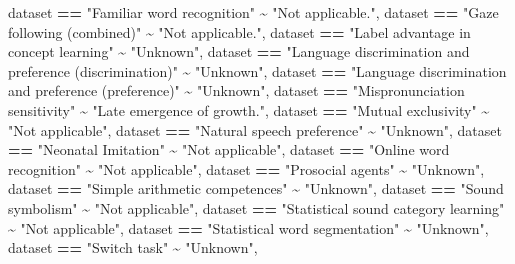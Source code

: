\documentclass[
]{article}
\newenvironment{Shaded}{\begin{snugshade}}{\end{snugshade}}
\newcommand{\NormalTok}[1]{#1}
\newcommand{\SpecialCharTok}[1]{\textcolor[rgb]{0.81,0.36,0.00}{\textbf{#1}}}
\newcommand{\StringTok}[1]{\textcolor[rgb]{0.31,0.60,0.02}{#1}}
\begin{document}
\begin{Shaded}
\begin{Highlighting}[]
\NormalTok{      dataset }\SpecialCharTok{==} \StringTok{"Familiar word recognition"} \SpecialCharTok{\textasciitilde{}} \StringTok{"Not applicable."}\NormalTok{, }
\NormalTok{      dataset }\SpecialCharTok{==} \StringTok{"Gaze following (combined)"} \SpecialCharTok{\textasciitilde{}} \StringTok{"Not applicable."}\NormalTok{, }
\NormalTok{      dataset }\SpecialCharTok{==} \StringTok{"Label advantage in concept learning"} \SpecialCharTok{\textasciitilde{}} \StringTok{"Unknown"}\NormalTok{, }
\NormalTok{      dataset }\SpecialCharTok{==} \StringTok{"Language discrimination and preference (discrimination)"} \SpecialCharTok{\textasciitilde{}} \StringTok{"Unknown"}\NormalTok{, }
\NormalTok{      dataset }\SpecialCharTok{==} \StringTok{"Language discrimination and preference (preference)"} \SpecialCharTok{\textasciitilde{}} \StringTok{"Unknown"}\NormalTok{, }
\NormalTok{      dataset }\SpecialCharTok{==} \StringTok{"Mispronunciation sensitivity"} \SpecialCharTok{\textasciitilde{}} \StringTok{"Late emergence of growth."}\NormalTok{, }
\NormalTok{      dataset }\SpecialCharTok{==} \StringTok{"Mutual exclusivity"} \SpecialCharTok{\textasciitilde{}} \StringTok{"Not applicable"}\NormalTok{,}
\NormalTok{      dataset }\SpecialCharTok{==} \StringTok{"Natural speech preference"} \SpecialCharTok{\textasciitilde{}} \StringTok{"Unknown"}\NormalTok{,}
\NormalTok{      dataset }\SpecialCharTok{==} \StringTok{"Neonatal Imitation"} \SpecialCharTok{\textasciitilde{}} \StringTok{"Not applicable"}\NormalTok{, }
\NormalTok{      dataset }\SpecialCharTok{==} \StringTok{"Online word recognition"} \SpecialCharTok{\textasciitilde{}} \StringTok{"Not applicable"}\NormalTok{, }
\NormalTok{      dataset }\SpecialCharTok{==} \StringTok{"Prosocial agents"} \SpecialCharTok{\textasciitilde{}} \StringTok{"Unknown"}\NormalTok{, }
\NormalTok{      dataset }\SpecialCharTok{==} \StringTok{"Simple arithmetic competences"} \SpecialCharTok{\textasciitilde{}} \StringTok{"Unknown"}\NormalTok{, }
\NormalTok{      dataset }\SpecialCharTok{==} \StringTok{"Sound symbolism"} \SpecialCharTok{\textasciitilde{}} \StringTok{"Not applicable"}\NormalTok{, }
\NormalTok{      dataset }\SpecialCharTok{==} \StringTok{"Statistical sound category learning"} \SpecialCharTok{\textasciitilde{}} \StringTok{"Not applicable"}\NormalTok{, }
\NormalTok{      dataset }\SpecialCharTok{==} \StringTok{"Statistical word segmentation"} \SpecialCharTok{\textasciitilde{}} \StringTok{"Unknown"}\NormalTok{,}
\NormalTok{      dataset }\SpecialCharTok{==} \StringTok{"Switch task"} \SpecialCharTok{\textasciitilde{}} \StringTok{"Unknown"}\NormalTok{, }

\end{Highlighting}
\end{Shaded}
\end{document}
